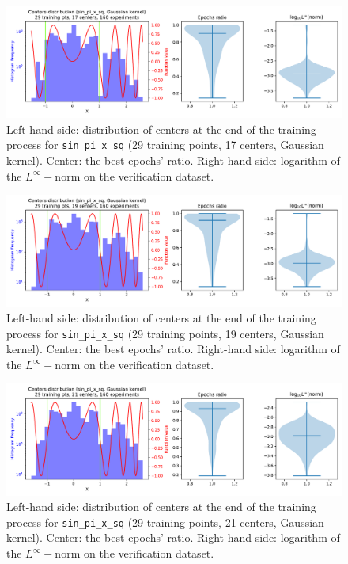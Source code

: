 \documentclass[12pt]{report} %
\begin{document}
\begin{figure}[ht]
  \centering
  \includegraphics[width=\textwidth]
  {imagenes/experiments/1d/sin_pi_x_sq_statistic_interpolation/tr29_c17_sin_pi_x_sq_gaussian_kernel.pdf}
  \caption{Left-hand side: distribution of centers at the end of the training process for
    \texttt{sin\_pi\_x\_sq} (29 training points, 17 centers, Gaussian kernel). Center: the best epochs' ratio.
    Right-hand side: logarithm of the $L^\infty-$norm on the verification dataset.}
  \label{fig:sin-pi-x-sq-statistic-tr29-c17}
\end{figure}

\begin{figure}[ht]
  \centering
  \includegraphics[width=\textwidth]
  {imagenes/experiments/1d/sin_pi_x_sq_statistic_interpolation/tr29_c19_sin_pi_x_sq_gaussian_kernel.pdf}
  \caption{Left-hand side: distribution of centers at the end of the training process for
    \texttt{sin\_pi\_x\_sq} (29 training points, 19 centers, Gaussian kernel). Center: the best epochs' ratio.
    Right-hand side: logarithm of the $L^\infty-$norm on the verification dataset.}
  \label{fig:sin-pi-x-sq-statistic-tr29-c19}
\end{figure}

\begin{figure}[ht]
  \centering
  \includegraphics[width=\textwidth]
  {imagenes/experiments/1d/sin_pi_x_sq_statistic_interpolation/tr29_c21_sin_pi_x_sq_gaussian_kernel.pdf}
  \caption{Left-hand side: distribution of centers at the end of the training process for
    \texttt{sin\_pi\_x\_sq} (29 training points, 21 centers, Gaussian kernel). Center: the best epochs' ratio.
    Right-hand side: logarithm of the $L^\infty-$norm on the verification dataset.}
  \label{fig:sin-pi-x-sq-statistic-tr29-c21}
\end{figure}
\end{document}

